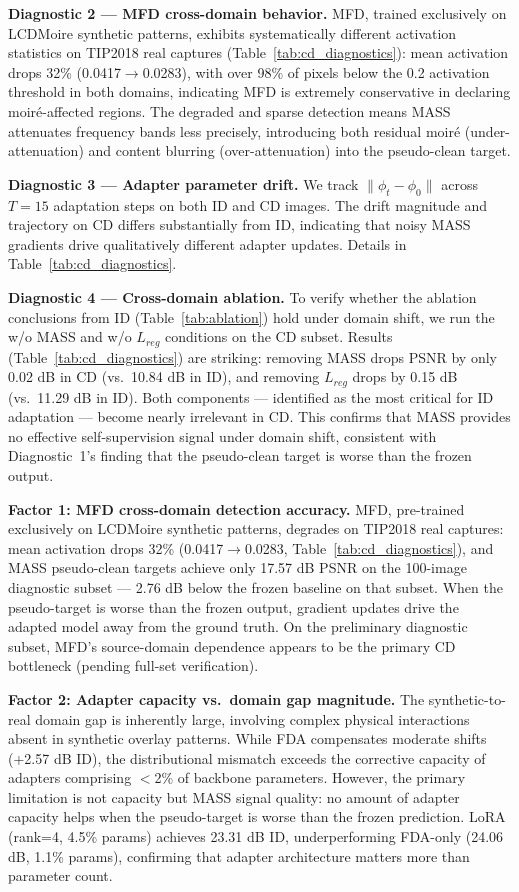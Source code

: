 \documentclass[review,10pt]{elsarticle}
\begin{document}
\noindent\textbf{Diagnostic 2 --- MFD cross-domain behavior.} MFD, trained exclusively on LCDMoire synthetic patterns, exhibits systematically different activation statistics on TIP2018 real captures (Table~\ref{tab:cd_diagnostics}): mean activation drops 32\% (0.0417$\to$0.0283), with over 98\% of pixels below the 0.2 activation threshold in both domains, indicating MFD is extremely conservative in declaring moir\'{e}-affected regions. The degraded and sparse detection means MASS attenuates frequency bands less precisely, introducing both residual moir\'{e} (under-attenuation) and content blurring (over-attenuation) into the pseudo-clean target.

\noindent\textbf{Diagnostic 3 --- Adapter parameter drift.} We track $\|\phi_t - \phi_0\|$ across $T=15$ adaptation steps on both ID and CD images. The drift magnitude and trajectory on CD differs substantially from ID, indicating that noisy MASS gradients drive qualitatively different adapter updates. Details in Table~\ref{tab:cd_diagnostics}.

\noindent\textbf{Diagnostic 4 --- Cross-domain ablation.} To verify whether the ablation conclusions from ID (Table~\ref{tab:ablation}) hold under domain shift, we run the w/o MASS and w/o $L_{reg}$ conditions on the CD subset. Results (Table~\ref{tab:cd_diagnostics}) are striking: removing MASS drops PSNR by only 0.02 dB in CD (vs.\ 10.84 dB in ID), and removing $L_{reg}$ drops by 0.15 dB (vs.\ 11.29 dB in ID). Both components --- identified as the most critical for ID adaptation --- become nearly irrelevant in CD. This confirms that MASS provides no effective self-supervision signal under domain shift, consistent with Diagnostic~1's finding that the pseudo-clean target is worse than the frozen output.
\smallskip

\textbf{Factor 1: MFD cross-domain detection accuracy.} MFD, pre-trained exclusively on LCDMoire synthetic patterns, degrades on TIP2018 real captures: mean activation drops 32\% (0.0417$\to$0.0283, Table~\ref{tab:cd_diagnostics}), and MASS pseudo-clean targets achieve only 17.57 dB PSNR on the 100-image diagnostic subset --- 2.76 dB below the frozen baseline on that subset. When the pseudo-target is worse than the frozen output, gradient updates drive the adapted model away from the ground truth. On the preliminary diagnostic subset, MFD's source-domain dependence appears to be the primary CD bottleneck (pending full-set verification).

\textbf{Factor 2: Adapter capacity vs.\ domain gap magnitude.} The synthetic-to-real domain gap is inherently large, involving complex physical interactions absent in synthetic overlay patterns. While FDA compensates moderate shifts (+2.57 dB ID), the distributional mismatch exceeds the corrective capacity of adapters comprising $<$2\% of backbone parameters. However, the primary limitation is not capacity but MASS signal quality: no amount of adapter capacity helps when the pseudo-target is worse than the frozen prediction. LoRA (rank=4, 4.5\% params) achieves 23.31 dB ID, underperforming FDA-only (24.06 dB, 1.1\% params), confirming that adapter architecture matters more than parameter count.
\end{document}
